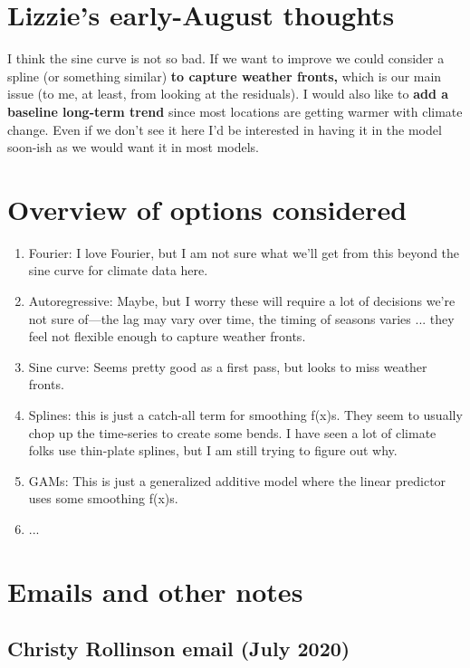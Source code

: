 \documentclass[11pt,letter]{article}
\begin{document}


\section{Lizzie's early-August thoughts}

I think the sine curve is not so bad. If we want to improve we could consider a spline (or something similar) {\bf to capture weather fronts,} which is our main issue (to me, at least, from looking at the residuals). I would also like to {\bf add a baseline long-term trend} since most locations are getting warmer with climate change. Even if we don't see it here I'd be interested in having it in the model soon-ish as we would want it in most models. 

\section{Overview of options considered}

\begin{enumerate}
\item Fourier: I love Fourier, but I am not sure what we'll get from this beyond the sine curve for climate data here.  
\item Autoregressive: Maybe, but I worry these will require a lot of decisions we're not sure of---the lag may vary over time, the timing of seasons varies ... they feel not flexible enough to capture weather fronts. 
\item Sine curve: Seems pretty good as a first pass, but looks to miss weather fronts. 
\item Splines: this is just a catch-all term for smoothing f(x)s. They seem to usually chop up the time-series to create some bends. I have seen a lot of climate folks use thin-plate splines, but I am still trying to figure out why. 
\item GAMs: This is just a generalized additive model where the linear predictor uses some smoothing f(x)s. 
\item ... 
\end{enumerate}

\section{Emails and other notes}

\subsection{Christy Rollinson email (July 2020)}
\end{document}
